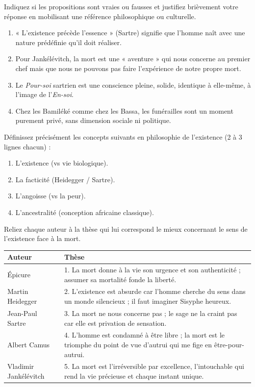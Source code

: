 \documentclass[11pt]{article}
\begin{document}
\begin{exercice}
Indiquez si les propositions sont vraies ou fausses et justifiez brièvement votre réponse en mobilisant une référence philosophique ou culturelle.
\begin{enumerate}
\item « L'existence précède l'essence » (Sartre) signifie que l'homme naît avec une nature prédéfinie qu'il doit réaliser.
\item Pour Jankélévitch, la mort est une « aventure » qui nous concerne au premier chef mais que nous ne pouvons pas faire l'expérience de notre propre mort.
\item Le \emph{Pour-soi} sartrien est une conscience pleine, solide, identique à elle-même, à l'image de l'\emph{En-soi}.
\item Chez les Bamiléké comme chez les Bassa, les funérailles sont un moment purement privé, sans dimension sociale ni politique.
\end{enumerate}
\end{exercice}

\begin{exercice}
Définissez précisément les concepts suivants en philosophie de l'existence (2 à 3 lignes chacun) :
\begin{enumerate}
\item L'existence (vs vie biologique).
\item La facticité (Heidegger / Sartre).
\item L'angoisse (vs la peur).
\item L'ancestralité (conception africaine classique).
\end{enumerate}
\end{exercice}

\begin{exercice}
Reliez chaque auteur à la thèse qui lui correspond le mieux concernant le sens de l'existence face à la mort.
\begin{center}
\begin{tabularx}{\linewidth}{|l|X|}\hline
\textbf{Auteur} & \textbf{Thèse} \\ \hline
Épicure & 1. La mort donne à la vie son urgence et son authenticité ; assumer sa mortalité fonde la liberté. \\ \hline
Martin Heidegger & 2. L'existence est absurde car l'homme cherche du sens dans un monde silencieux ; il faut imaginer Sisyphe heureux. \\ \hline
Jean-Paul Sartre & 3. La mort ne nous concerne pas ; le sage ne la craint pas car elle est privation de sensation. \\ \hline
Albert Camus & 4. L'homme est condamné à être libre ; la mort est le triomphe du point de vue d'autrui qui me fige en être-pour-autrui. \\ \hline
Vladimir Jankélévitch & 5. La mort est l'irréversible par excellence, l'intouchable qui rend la vie précieuse et chaque instant unique. \\ \hline
\end{tabularx}
\end{center}
\end{exercice}
\end{document}
